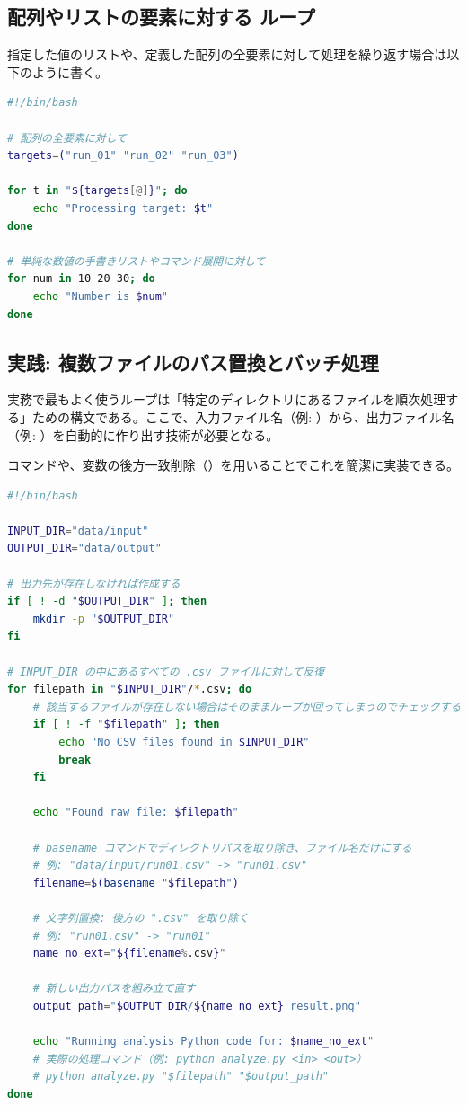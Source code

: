 \subsection{配列やリストの要素に対する  ループ}

指定した値のリストや、定義した配列の全要素に対して処理を繰り返す場合は以下のように書く。

\begin{lstlisting}[language=bash]
#!/bin/bash

# 配列の全要素に対して
targets=("run_01" "run_02" "run_03")

for t in "${targets[@]}"; do
    echo "Processing target: $t"
done

# 単純な数値の手書きリストやコマンド展開に対して
for num in 10 20 30; do
    echo "Number is $num"
done
\end{lstlisting}

\subsection{実践: 複数ファイルのパス置換とバッチ処理}

実務で最もよく使うループは「特定のディレクトリにあるファイルを順次処理する」ための構文である。ここで、入力ファイル名（例: ）から、出力ファイル名（例: ）を自動的に作り出す技術が必要となる。

 コマンドや、変数の後方一致削除（）を用いることでこれを簡潔に実装できる。

\begin{lstlisting}[language=bash]
#!/bin/bash

INPUT_DIR="data/input"
OUTPUT_DIR="data/output"

# 出力先が存在しなければ作成する
if [ ! -d "$OUTPUT_DIR" ]; then
    mkdir -p "$OUTPUT_DIR"
fi

# INPUT_DIR の中にあるすべての .csv ファイルに対して反復
for filepath in "$INPUT_DIR"/*.csv; do
    # 該当するファイルが存在しない場合はそのままループが回ってしまうのでチェックする
    if [ ! -f "$filepath" ]; then
        echo "No CSV files found in $INPUT_DIR"
        break
    fi

    echo "Found raw file: $filepath"

    # basename コマンドでディレクトリパスを取り除き、ファイル名だけにする
    # 例: "data/input/run01.csv" -> "run01.csv"
    filename=$(basename "$filepath")

    # 文字列置換: 後方の ".csv" を取り除く
    # 例: "run01.csv" -> "run01"
    name_no_ext="${filename%.csv}"

    # 新しい出力パスを組み立て直す
    output_path="$OUTPUT_DIR/${name_no_ext}_result.png"

    echo "Running analysis Python code for: $name_no_ext"
    # 実際の処理コマンド（例: python analyze.py <in> <out>）
    # python analyze.py "$filepath" "$output_path"
done
\end{lstlisting}

